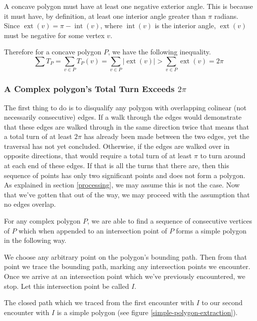 \documentclass{article}
\newcommand{\inta}{\operatorname{int}} %
\newcommand{\exta}{\operatorname{ext}} %
\begin{document}
A concave polygon must have at least one negative exterior angle. This is because it must have, by definition, at least one interior angle greater than \(\pi\) radians. Since \(\exta(v) = \pi - \inta(v)\), where \(\inta(v)\) is the interior angle, \(\exta(v)\) must be negative for some vertex \(v\).

Therefore for a concave polygon \(P\), we have the following inequality.
\begin{equation*}
	\sum T_P = \sum_{v \in P} T_P(v) = \sum_{v \in P} | \exta(v) | > \sum_{v \in P} \exta(v) = 2\pi
\end{equation*}

\subsubsection{A Complex polygon's Total Turn Exceeds \(2\pi\)}

The first thing to do is to disqualify any polygon with overlapping colinear (not necessarily consecutive) edges. If a walk through the edges would demonstrate that these edges are walked through in the same direction twice that means that a total turn of at least \(2\pi\) has already been made between the two edges, yet the traversal has not yet concluded. Otherwise, if the edges are walked over in opposite directions, that would require a total turn of at least \(\pi\) to turn around at each end of these edges. If that is all the turns that there are, then this sequence of points has only two significant points and does not form a polygon. As explained in section \ref{processing}, we may assume this is not the case. Now that we've gotten that out of the way, we may proceed with the assumption that no edges overlap.

For any complex polygon \(P\), we are able to find a sequence of consecutive vertices of \(P\) which when appended to an intersection point of \(P\) forms a simple polygon in the following way.

We choose any arbitrary point on the polygon's bounding path. Then from that point we trace the bounding path, marking any intersection points we encounter. Once we arrive at an intersection point which we've previously encountered, we stop. Let this intersection point be called \(I\).

The closed path which we traced from the first encounter with \(I\) to our second encounter with \(I\) is a simple polygon (see figure \ref{simple-polygon-extraction}).
\end{document}

